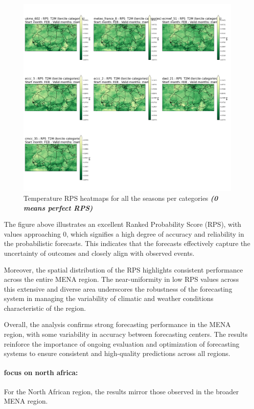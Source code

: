 \begin{figure}[H]
    \centering
    \includegraphics[width=1\linewidth]{plots/prob/rps/rps_mam_t2m.png}
    \caption{Temperature RPS  heatmaps for all the seasons per categories \textbf{\textit{(0 means perfect RPS)}}}
\end{figure}

The figure above illustrates an excellent Ranked Probability Score (RPS), with values approaching 0, which signifies a high degree of accuracy and reliability in the probabilistic forecasts. This indicates that the forecasts effectively capture the uncertainty of outcomes and closely align with observed events.

Moreover, the spatial distribution of the RPS highlights consistent performance across the entire MENA region. The near-uniformity in low RPS values across this extensive and diverse area underscores the robustness of the forecasting system in managing the variability of climatic and weather conditions characteristic of the region.


Overall, the analysis confirms strong forecasting performance in the MENA region, with some variability in accuracy between forecasting centers. The results reinforce the importance of ongoing evaluation and optimization of forecasting systems to ensure consistent and high-quality predictions across all regions.
\paragraph{focus on north africa:}
For the North African region, the results mirror those observed in the broader MENA region.  

